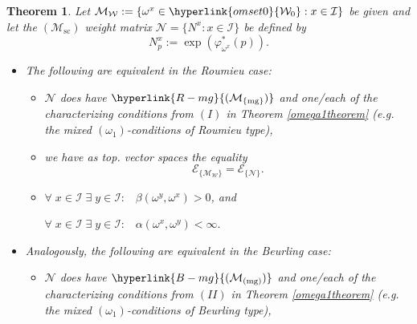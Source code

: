\documentclass[10pt]{amsart}%
\numberwithin{equation}{section}
\theoremstyle{plain}
\newtheorem{theorem}[proposition]{Theorem}
\let\on=\operatorname
\begin{document}
\begin{theorem}\label{generalweightmatrixthm}
Let $\mathcal{M}_{\mathcal{W}}:=\{\omega^x\in\hyperlink{omset0}{\mathcal{W}_0}: x\in\mathcal{I}\}$ be given and let the \hyperlink{Msc}{$(\mathcal{M}_{\on{sc}})$} weight matrix $\mathcal{N}=\{N^x: x\in\mathcal{I}\}$ be defined by
\begin{equation}\label{generalweightmatrixthmequ}
N^x_p:=\exp(\varphi^{*}_{\omega^x}(p)).
\end{equation}

\begin{itemize}
\item[$(I)$] The following are equivalent in the Roumieu case:

\begin{itemize}
\item[$(i)$] $\mathcal{N}$ does have $\hyperlink{R-mg}{(\mathcal{M}_{\{\on{mg}\}})}$ and one/each of the characterizing conditions from $(I)$ in Theorem \ref{omega1theorem} (e.g. the mixed \hyperlink{om1}{$(\omega_1)$}-conditions of Roumieu type),

\item[$(ii)$] we have as top. vector spaces the equality
$$\mathcal{E}_{\{\mathcal{M}_{\mathcal{W}}\}}=\mathcal{E}_{\{\mathcal{N}\}}.$$


\item[$(iii)$] $\forall\;x\in\mathcal{I}\;\exists\;y\in\mathcal{I}:\;\;\;\beta(\omega^{y},\omega^{x})>0$, and\par
$\forall\;x\in\mathcal{I}\;\exists\;y\in\mathcal{I}:\;\;\; \alpha(\omega^{x},\omega^{y})<\infty.$

\end{itemize}

\item[$(II)$] Analogously, the following are equivalent in the Beurling case:

\begin{itemize}
\item[$(i)$] $\mathcal{N}$ does have $\hyperlink{B-mg}{(\mathcal{M}_{(\on{mg})})}$ and one/each of the characterizing conditions from $(II)$ in Theorem \ref{omega1theorem} (e.g. the mixed \hyperlink{om1}{$(\omega_1)$}-conditions of Beurling type),


\end{itemize}
\end{itemize}
\end{theorem}
\end{document}
